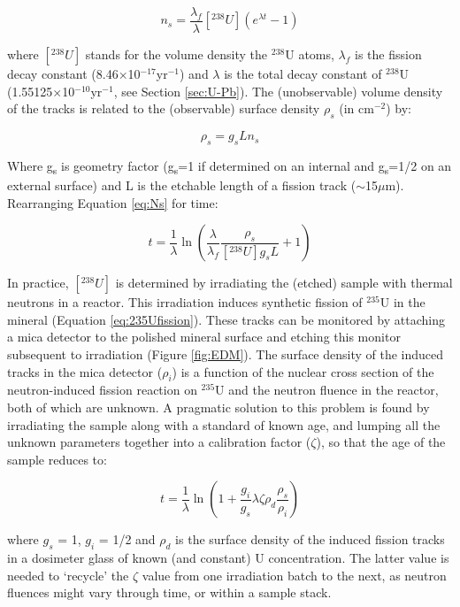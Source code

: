 \documentclass{book}
\begin{document}
\begin{equation}
n_{s} = \frac{\lambda_f}{\lambda} [^{238}U] \left(e^{\lambda t}-1\right)
\label{eq:Ns}
\end{equation}

where $[^{238}U]$ stands for the volume density the $^{238}$U atoms,
$\lambda_f$ is the fission decay constant
(8.46$\times$10$^{-17}$yr$^{-1}$) and $\lambda$ is the total decay
constant of $^{238}$U (1.55125$\times$10$^{-10}$yr$^{-1}$, see Section
\ref{sec:U-Pb}). The (unobservable) volume density of the tracks is
related to the (observable) surface density $\rho_s$ (in cm$^{-2}$)
by:

\begin{equation}
\rho_s = g_s L n_s
\label{eq:rhos}
\end{equation}

Where g\textsubscript{s} is geometry factor (g\textsubscript{s}=1 if
determined on an internal and g\textsubscript{s}=1/2 on an external
surface) and L is the etchable length of a fission track
($\sim$15$\mu$m). Rearranging Equation \ref{eq:Ns} for time:

\begin{equation}
t = \frac{1}{\lambda}
\ln\left(\frac{\lambda}{\lambda_f}\frac{\rho_s}{[^{238}U] g_s L
}+1\right)
\label{eq:tFT}
\end{equation}

In practice, $[^{238}U]$ is determined by irradiating the (etched)
sample with thermal neutrons in a reactor. This irradiation induces
synthetic fission of $^{235}$U in the mineral (Equation
\ref{eq:235Ufission}). These tracks can be monitored by attaching a
mica detector to the polished mineral surface and etching this monitor
subsequent to irradiation (Figure \ref{fig:EDM}). The surface density
of the induced tracks in the mica detector ($\rho_i$) is a function of
the nuclear cross section of the neutron-induced fission reaction on
$^{235}$U and the neutron fluence in the reactor, both of which are
unknown. A pragmatic solution to this problem is found by irradiating
the sample along with a standard of known age, and lumping all the
unknown parameters together into a calibration factor ($\zeta$), so
that the age of the sample reduces to:

\begin{equation}
t = \frac{1}{\lambda}\ln\left(1+\frac{g_i}{g_s}\lambda\zeta\rho_d\frac{\rho_s}{\rho_i}\right)
\label{eq:tzeta}
\end{equation}

where $g_s$ = 1, $g_i$ = 1/2 and $\rho_d$ is the surface density of
the induced fission tracks in a dosimeter glass of known (and
constant) U concentration. The latter value is needed to `recycle' the
$\zeta$ value from one irradiation batch to the next, as neutron
fluences might vary through time, or within a sample stack.\\
\end{document}
